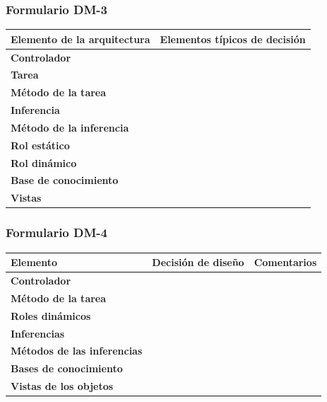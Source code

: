 \documentclass[a4paper,11pt]{article}
\begin{document}
			\subsubsection{Formulario DM-3}
			\begin{center}
				\begin{tabular}{| l | l |}
					\hline
					\textbf{Elemento de la arquitectura} & \textbf{Elementos típicos de
					decisión} \\
					\hline
					\textbf{Controlador} & \\
					\hline
					\textbf{Tarea} & \\
					\hline
					\textbf{Método de la tarea} & \\
					\hline
					\textbf{Inferencia} &  \\
					\hline
					\textbf{Método de la inferencia} & \\
					\hline
					\textbf{Rol estático} & \\
					\hline
					\textbf{Rol dinámico} & \\
					\hline
					\textbf{Base de conocimiento} & \\
					\hline
					\textbf{Vistas} & \\
					\hline
				\end{tabular}
			\end{center}
			\subsubsection{Formulario DM-4}
			\begin{center}
				\begin{tabular}{| l | l | l |}
					\hline
					\textbf{Elemento} & \textbf{Decisión de diseño} & \textbf{Comentarios} \\
					\hline
					\textbf{Controlador} &  & \\
					\hline
					\textbf{Método de la tarea} &  & \\
					\hline
					\textbf{Roles dinámicos} &  & \\
					\hline
					\textbf{Inferencias} &  & \\
					\hline
					\textbf{Métodos de las inferencias} &  & \\
					\hline
					\textbf{Bases de conocimiento} &  & \\
					\hline
					\textbf{Vistas de los objetos} &  & \\
					\hline
				\end{tabular}
			\end{center}
\end{document}
